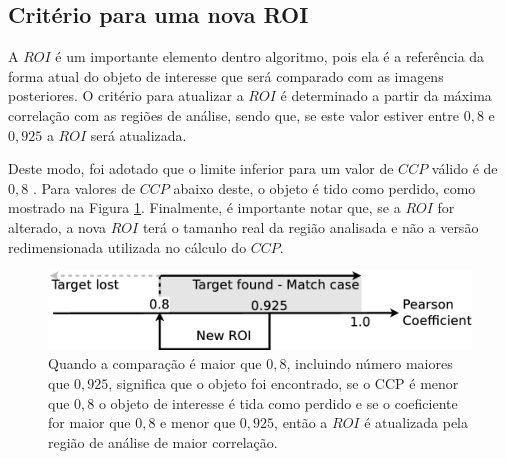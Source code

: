 \subsection{Critério para uma nova ROI}

A $ROI$ é um importante elemento dentro algoritmo, pois ela é a referência da
forma atual do objeto de interesse que será comparado com as imagens posteriores.
O critério para atualizar a $ROI$ é determinado a partir da máxima correlação 
com as regiões de análise, sendo que, se este valor estiver entre $0,8$ 
e $0,925$ a $ROI$ será atualizada.

Deste modo, foi adotado que o limite inferior para um valor de $CCP$ válido é de $0,8$ \cite{Eugene}. Para valores
de $CCP$ abaixo deste, o objeto é tido como perdido, como mostrado na Figura
\ref{fig:newroicri}.
Finalmente, é importante notar que, se a $ROI$ for alterado, a nova $ROI$ terá 
o tamanho real da região analisada e não a versão redimensionada utilizada no cálculo do $CCP$.


\begin{figure}[H]
\includegraphics[width=\columnwidth]{images/figure3.eps}
\caption{Quando a comparação é maior que $0,8$, incluindo número maiores que $0,925$, 
significa que o objeto foi encontrado,
se o CCP é menor que $0,8$ o objeto de interesse é tida como perdido e se o coeficiente for maior que $0,8$ 
e menor que $0,925$, então a $ROI$ é atualizada pela região de análise de 
maior correlação.}
\label{fig:newroicri}
\end{figure}


